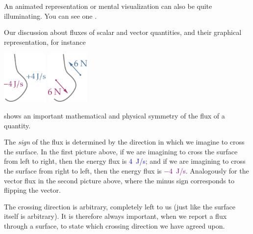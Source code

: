 An animated representation or mental visualization can also be quite illuminating. You can see one .

\label{nsec:fluxes_symmetry}

Our discussion about fluxes of scalar and vector quantities, and their graphical representation, for instance
\begin{center}\hspace*{\fill}
  \includegraphics[height=7em]{images/flux_both.pdf}
  \hfill \includegraphics[height=7em]{images/flux_vec_both.pdf} \hspace*{\fill}
\end{center}
shows an important mathematical and physical symmetry of the flux of a quantity.

The \emph{sign} of the flux is determined by the direction in which we imagine to cross the surface. In the first picture above, if we are imagining to cross the surface from left to right, then the energy flux is \textcolor{blue}{\qty{+4}{J/s}}; and if we are imagining to cross the surface from right to left, then the energy flux is \textcolor{purple}{\qty{-4}{J/s}}. Analogously for the vector flux in the second picture above, where the minus sign corresponds to flipping the vector.

The crossing direction is arbitrary, completely left to us (just like the surface itself is arbitrary). It is therefore always important, when we report a flux through a surface, to state which crossing direction we have agreed upon.


